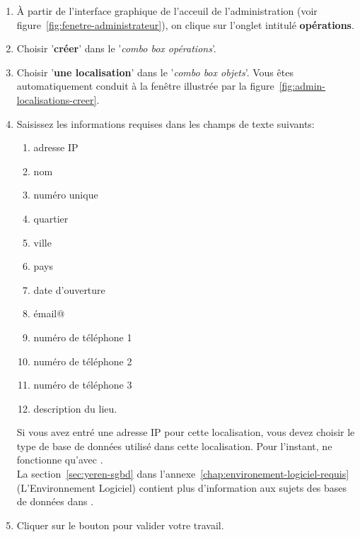 \begin{enumerate}[1)]
	\item \`A partir de l'interface graphique de l'acceuil de
		l'administration (voir figure~\ref{fig:fenetre-administrateur}),
		on clique sur l'onglet intitul\'e \textbf{op\'erations}. 
		
	\item Choisir '\textbf{cr\'eer}' dans le '\emph{combo box
		op\'erations}'.
		
	\item Choisir '\textbf{une localisation}' dans
		le '\emph{combo box objets}'. Vous \^etes automatiquement
		conduit \`a la fen\^etre illustr\'ee par la
		figure~\ref{fig:admin-localisations-creer}.
		
	\item Saisissez les informations requises dans les champs
		de texte suivants:
		\begin{enumerate}[1)]
			\item adresse IP \optionel
			\item nom
			\item num\'ero unique \optionel
			\item quartier
			\item ville
			\item pays \optionel
			\item date d'ouverture \optionel
			\item \'email@ \optionel
			\item num\'ero de t\'el\'ephone 1 \optionel
			\item num\'ero de t\'el\'ephone 2 \optionel
			\item num\'ero de t\'el\'ephone 3 \optionel						
			\item description du lieu. \optionel\\
		\end{enumerate}
		
		Si vous avez entr\'e une adresse IP pour cette 
		localisation, vous devez choisir le type de base de
		donn\'ees utilis\'e dans cette localisation. Pour
		l'instant, \yeren ne fonctionne qu'avec .\\
		
		La section~\ref{sec:yeren-sgbd} dans
		l'annexe~\ref{chap:environement-logiciel-requis}
		(L'Environnement Logiciel) contient plus d'information
		aux sujets des bases de donn\'ees dans \yeren.
		
	\item Cliquer sur le bouton  pour
		valider votre travail.	
\end{enumerate}

